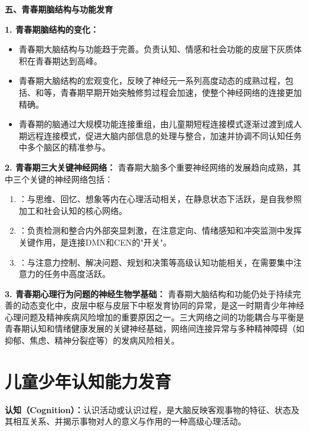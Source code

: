 \begin{keybox}
\textbf{五、青春期脑结构与功能发育}

\textbf{1. 青春期脑结构的变化：}
\begin{itemize}[leftmargin=*]
    \item 青春期大脑结构与功能趋于完善。负责认知、情感和社会功能的皮层下灰质体积在青春期达到高峰。
    \item 青春期大脑结构的宏观变化，反映了神经元一系列高度动态的成熟过程，包括、和等，青春期早期开始突触修剪过程会加速，使整个神经网络的连接更加精确。
    \item 青春期的脑通过大规模功能连接重组，由儿童期短程连接模式逐渐过渡到成人期远程连接模式，促进大脑内部信息的处理与整合，加速并协调不同认知任务中多个脑区的精准参与。
\end{itemize}

\textbf{2. 青春期三大关键神经网络：}
青春期大脑多个重要神经网络的发展趋向成熟，其中三个关键的神经网络包括：

\begin{enumerate}[leftmargin=*]
    \item {}：与思维、回忆、想象等内在心理活动相关，在静息状态下活跃，是自我参照加工和社会认知的核心网络。
    \item {}：负责检测和整合内外部突显刺激，在注意定向、情绪感知和冲突监测中发挥关键作用，是连接DMN和CEN的"开关"。
    \item {}：与注意力控制、解决问题、规划和决策等高级认知功能相关，在需要集中注意力的任务中高度活跃。
\end{enumerate}

\textbf{3. 青春期心理行为问题的神经生物学基础：}
青春期大脑结构和功能仍处于持续完善的动态变化中，皮层中枢与皮层下中枢发育协同的异常，是这一时期青少年神经心理问题及精神疾病风险增加的重要原因之一。三大网络之间的功能耦合与平衡是青春期认知和情绪健康发展的关键神经基础，网络间连接异常与多种精神障碍（如抑郁、焦虑、精神分裂症等）的发病风险相关。
\end{keybox}

\section{儿童少年认知能力发育}

\begin{keybox}
\textbf{认知（Cognition）：}认识活动或认识过程，是大脑反映客观事物的特征、状态及其相互关系、并揭示事物对人的意义与作用的一种高级心理活动。
\end{keybox}

